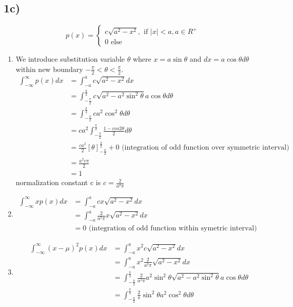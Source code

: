\subsection*{1c)} %
\label{subsection:1c Presented)}
\[
p(x)=
\begin{cases}
c\sqrt{a^2-x^2}, \text{ if } \left | x \right | < a, a \in R^+ \\
0 \text{ else } 
\end{cases}
\]

\begin{enumerate}
	\item 
	We introduce substitution variable  $\theta$ where $x = a\sin\theta$ and $dx = a\cos\theta d\theta$ within new boundary $-\frac{\pi}{2}<\theta<\frac{\pi}{2}$.  \\
	\begin{align*}   
	\int_{-\infty}^{\infty}p(x)dx &= \int_{-a}^{a}c\sqrt{a^2-x^2}dx \\ &=
	\int_{-\frac{\pi}{2}}^{\frac{\pi}{2}}c\sqrt{a^2-a^2\sin^{2}\theta}a\cos\theta d\theta \\ &= 
	\int_{-\frac{\pi}{2}}^{\frac{\pi}{2}}ca^2\cos^{2}\theta d\theta \\ &= 
	ca^2\int_{-\frac{\pi}{2}}^{\frac{\pi}{2}}\frac{1-cos2\theta}{2} d\theta \\ &= 
	\frac{ca^2}{2}[\theta]_{-\frac{\pi}{2}}^{\frac{\pi}{2}} + 0 \text{ (integration of odd function over symmetric interval)} \\ &= 
	\frac{a^2c\pi}{2} \\ &= 1 
	\end{align*}	 
	normalization constant c is $c = \frac{2}{a^2\pi}$
	\item 
	\begin{align*}   
	\int_{-\infty}^{\infty}xp(x)dx &= \int_{-a}^{a}cx\sqrt{a^2-x^2}dx
	\\ &= \int_{-a}^{a}\frac{2}{a^2\pi}x\sqrt{a^2-x^2}dx
    \\ &= 0  	\text { (integration of odd function within symetric interval) }
	\end{align*} 
	\item 
	\begin{align*}  
	\int_{-\infty}^{\infty}(x-\mu)^2p(x)dx &=  \int_{-a}^{a}x^{2}c\sqrt{a^2-x^2}dx 
	\\ &= \int_{-a}^{a}x^{2}\frac{2}{a^2\pi}\sqrt{a^2-x^2}dx 
	\\ &= \int_{-\frac{\pi}{2}}^{\frac{\pi}{2}}\frac{2}{a^2\pi}a^2\sin^2\theta  \sqrt{a^2-a^2\sin^{2}\theta}a\cos\theta d\theta 
	\\ &= \int_{-\frac{\pi}{2}}^{\frac{\pi}{2}}\frac{2}{\pi}\sin^2\theta a^2\cos^2\theta d\theta 

\end{align*}
\end{enumerate}

